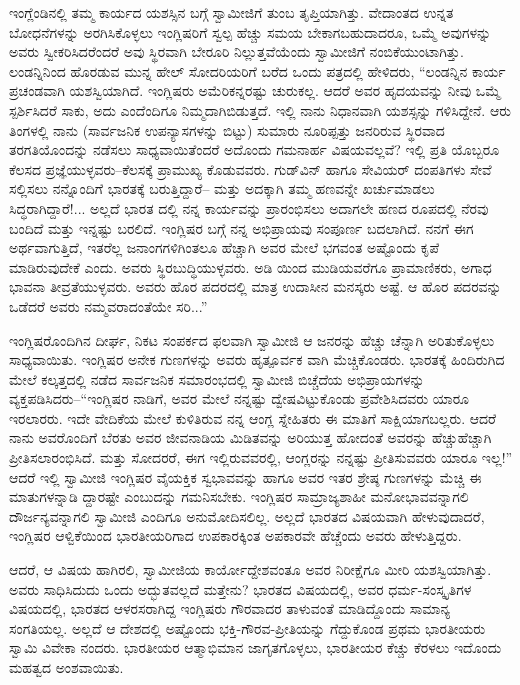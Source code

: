 ಇಂಗ್ಲೆಂಡಿನಲ್ಲಿ ತಮ್ಮ ಕಾರ್ಯದ ಯಶಸ್ಸಿನ ಬಗ್ಗೆ ಸ್ವಾಮೀಜಿಗೆ ತುಂಬ ತೃಪ್ತಿಯಾಗಿತ್ತು. ವೇದಾಂತದ ಉನ್ನತ ಬೋಧನೆಗಳನ್ನು ಅರಗಿಸಿಕೊಳ್ಳಲು ಇಂಗ್ಲಿಷರಿಗೆ ಸ್ವಲ್ಪ ಹೆಚ್ಚು ಸಮಯ ಬೇಕಾಗಬಹುದಾದರೂ, ಒಮ್ಮೆ ಅವುಗಳನ್ನು ಅವರು ಸ್ವೀಕರಿಸಿದರೆಂದರೆ ಅವು ಸ್ಥಿರವಾಗಿ ಬೇರೂರಿ ನಿಲ್ಲುತ್ತವೆಯೆಂದು ಸ್ವಾಮೀಜಿಗೆ ನಂಬಿಕೆಯುಂಟಾಗಿತ್ತು. ಲಂಡನ್ನಿನಿಂದ ಹೊರಡುವ ಮುನ್ನ ಹೇಲ್ ಸೋದರಿಯರಿಗೆ ಬರೆದ ಒಂದು ಪತ್ರದಲ್ಲಿ ಹೇಳಿದರು, “ಲಂಡನ್ನಿನ ಕಾರ್ಯ ಪ್ರಚಂಡವಾಗಿ ಯಶಸ್ವಿಯಾಗಿದೆ. ಇಂಗ್ಲಿಷರು ಅಮೆರಿಕನ್ನರಷ್ಟು ಚುರುಕಲ್ಲ. ಆದರೆ ಅವರ ಹೃದಯವನ್ನು ನೀವು ಒಮ್ಮೆ ಸ್ಪರ್ಶಿಸಿದರೆ ಸಾಕು, ಅದು ಎಂದೆಂದಿಗೂ ನಿಮ್ಮದಾಗಿಬಿಡುತ್ತದೆ. ಇಲ್ಲಿ ನಾನು ನಿಧಾನವಾಗಿ ಯಶಸ್ಸನ್ನು ಗಳಿಸಿದ್ದೇನೆ. ಆರು ತಿಂಗಳಲ್ಲಿ ನಾನು (ಸಾರ್ವಜನಿಕ ಉಪನ್ಯಾಸಗಳನ್ನು ಬಿಟ್ಟು) ಸುಮಾರು ನೂರಿಪ್ಪತ್ತು ಜನರಿರುವ ಸ್ಥಿರವಾದ ತರಗತಿಯೊಂದನ್ನು ನಡೆಸಲು ಸಾಧ್ಯವಾಯಿತೆಂದರೆ ಅದೊಂದು ಗಮನಾರ್ಹ ವಿಷಯವಲ್ಲವೆ? ಇಲ್ಲಿ ಪ್ರತಿ ಯೊಬ್ಬರೂ ಕೆಲಸದ ಪ್ರಜ್ಞೆಯುಳ್ಳವರು–ಕೆಲಸಕ್ಕೆ ಪ್ರಾಮುಖ್ಯ ಕೊಡುವವರು. ಗುಡ್​ವಿನ್ ಹಾಗೂ ಸೇವಿಯರ್ ದಂಪತಿಗಳು ಸೇವೆ ಸಲ್ಲಿಸಲು ನನ್ನೊಂದಿಗೆ ಭಾರತಕ್ಕೆ ಬರುತ್ತಿದ್ದಾರೆ– ಮತ್ತು ಅದಕ್ಕಾಗಿ ತಮ್ಮ ಹಣವನ್ನೇ ಖರ್ಚುಮಾಡಲು ಸಿದ್ಧರಾಗಿದ್ದಾರೆ!... ಅಲ್ಲದೆ ಭಾರತ ದಲ್ಲಿ ನನ್ನ ಕಾರ್ಯವನ್ನು ಪ್ರಾರಂಭಿಸಲು ಅದಾಗಲೇ ಹಣದ ರೂಪದಲ್ಲಿ ನೆರವು ಬಂದಿದೆ ಮತ್ತು ಇನ್ನಷ್ಟು ಬರಲಿದೆ. ಇಂಗ್ಲಿಷರ ಬಗ್ಗೆ ನನ್ನ ಅಭಿಪ್ರಾಯವು ಸಂಪೂರ್ಣ ಬದಲಾಗಿದೆ. ನನಗೆ ಈಗ ಅರ್ಥವಾಗುತ್ತಿದೆ, ಇತರೆಲ್ಲ ಜನಾಂಗಗಳಿಗಿಂತಲೂ ಹೆಚ್ಚಾಗಿ ಅವರ ಮೇಲೆ ಭಗವಂತ ಅಷ್ಟೊಂದು ಕೃಪೆ ಮಾಡಿರುವುದೇಕೆ ಎಂದು. ಅವರು ಸ್ಥಿರಬುದ್ಧಿಯುಳ್ಳವರು. ಅಡಿ ಯಿಂದ ಮುಡಿಯವರೆಗೂ ಪ್ರಾಮಾಣಿಕರು, ಅಗಾಧ ಭಾವನಾ ತೀವ್ರತೆಯುಳ್ಳವರು. ಅವರು ಹೊರ ಪದರದಲ್ಲಿ ಮಾತ್ರ ಉದಾಸೀನ ಮನಸ್ಕರು ಅಷ್ಟೆ. ಆ ಹೊರ ಪದರವನ್ನು ಒಡೆದರೆ ಅವರು ನಮ್ಮವರಾದಂತೆಯೇ ಸರಿ...”

ಇಂಗ್ಲಿಷರೊಂದಿಗಿನ ದೀರ್ಘ, ನಿಕಟ ಸಂಪರ್ಕದ ಫಲವಾಗಿ ಸ್ವಾಮೀಜಿ ಆ ಜನರನ್ನು ಹೆಚ್ಚು ಚೆನ್ನಾಗಿ ಅರಿತುಕೊಳ್ಳಲು ಸಾಧ್ಯವಾಯಿತು. ಇಂಗ್ಲಿಷರ ಅನೇಕ ಗುಣಗಳನ್ನು ಅವರು ಹೃತ್ಪೂರ್ವಕ ವಾಗಿ ಮೆಚ್ಚಿಕೊಂಡರು. ಭಾರತಕ್ಕೆ ಹಿಂದಿರುಗಿದ ಮೇಲೆ ಕಲ್ಕತ್ತದಲ್ಲಿ ನಡೆದ ಸಾರ್ವಜನಿಕ ಸಮಾರಂಭದಲ್ಲಿ ಸ್ವಾಮೀಜಿ ಬಿಚ್ಚೆದೆಯ ಅಭಿಪ್ರಾಯಗಳನ್ನು ವ್ಯಕ್ತಪಡಿಸಿದರು–“ಇಂಗ್ಲಿಷರ ನಾಡಿಗೆ, ಅವರ ಮೇಲೆ ನನ್ನಷ್ಟು ದ್ವೇಷವಿಟ್ಟುಕೊಂಡು ಪ್ರವೇಶಿಸಿದವರು ಯಾರೂ ಇರಲಾರರು. ಇದೇ ವೇದಿಕೆಯ ಮೇಲೆ ಕುಳಿತಿರುವ ನನ್ನ ಆಂಗ್ಲ ಸ್ನೇಹಿತರು ಈ ಮಾತಿಗೆ ಸಾಕ್ಷಿಯಾಗಬಲ್ಲರು. ಆದರೆ ನಾನು ಅವರೊಂದಿಗೆ ಬೆರತು ಅವರ ಜೀವನಾಡಿಯ ಮಿಡಿತವನ್ನು ಅರಿಯುತ್ತ ಹೋದಂತೆ ಅವರನ್ನು ಹೆಚ್ಚುಹೆಚ್ಚಾಗಿ ಪ್ರೀತಿಸಲಾರಂಭಿಸಿದೆ. ಮತ್ತು ಸೋದರರೆ, ಈಗ ಇಲ್ಲಿರುವವರಲ್ಲಿ, ಆಂಗ್ಲರನ್ನು ನನ್ನಷ್ಟು ಪ್ರೀತಿಸುವವರು ಯಾರೂ ಇಲ್ಲ!” ಆದರೆ ಇಲ್ಲಿ ಸ್ವಾಮೀಜಿ ಇಂಗ್ಲಿಷರ ವೈಯಕ್ತಿಕ ಸ್ವಭಾವವನ್ನು ಹಾಗೂ ಅವರ ಇತರ ಶ್ರೇಷ್ಠ ಗುಣಗಳನ್ನು ಮೆಚ್ಚಿ ಈ ಮಾತುಗಳನ್ನಾಡಿ ದ್ದಾರಷ್ಟೇ ಎಂಬುದನ್ನು ಗಮನಿಸಬೇಕು. ಇಂಗ್ಲಿಷರ ಸಾಮ್ರಾಜ್ಯಶಾಹೀ ಮನೋಭಾವವನ್ನಾಗಲಿ ದೌರ್ಜನ್ಯವನ್ನಾಗಲಿ ಸ್ವಾಮೀಜಿ ಎಂದಿಗೂ ಅನುಮೋದಿಸಲಿಲ್ಲ. ಅಲ್ಲದೆ ಭಾರತದ ವಿಷಯವಾಗಿ ಹೇಳುವುದಾದರೆ, ಇಂಗ್ಲಿಷರ ಆಳ್ವಿಕೆಯಿಂದ ಭಾರತೀಯರಿಗಾದ ಉಪಕಾರಕ್ಕಿಂತ ಅಪಕಾರವೇ ಹೆಚ್ಚೆಂದು ಅವರು ಹೇಳುತ್ತಿದ್ದರು.

ಆದರೆ, ಆ ವಿಷಯ ಹಾಗಿರಲಿ, ಸ್ವಾಮೀಜಿಯ ಕಾರ್ಯೋದ್ದೇಶವಂತೂ ಅವರ ನಿರೀಕ್ಷೆಗೂ ಮೀರಿ ಯಶಸ್ವಿಯಾಗಿತ್ತು. ಅವರು ಸಾಧಿಸಿದುದು ಒಂದು ಅದ್ಭುತವಲ್ಲದೆ ಮತ್ತೇನು? ಭಾರತದ ವಿಷಯದಲ್ಲಿ, ಅವರ ಧರ್ಮ-ಸಂಸ್ಕೃತಿಗಳ ವಿಷಯದಲ್ಲಿ, ಭಾರತದ ಆಳರಸರಾಗಿದ್ದ ಇಂಗ್ಲಿಷರು ಗೌರವಾದರ ತಾಳುವಂತೆ ಮಾಡಿದ್ದೊಂದು ಸಾಮಾನ್ಯ ಸಂಗತಿಯಲ್ಲ. ಅಲ್ಲದೆ ಆ ದೇಶದಲ್ಲಿ ಅಷ್ಟೊಂದು ಭಕ್ತಿ-ಗೌರವ-ಪ್ರೀತಿಯನ್ನು ಗೆದ್ದುಕೊಂಡ ಪ್ರಥಮ ಭಾರತೀಯರು ಸ್ವಾಮಿ ವಿವೇಕಾ ನಂದರು. ಭಾರತೀಯರ ಆತ್ಮಾಭಿಮಾನ ಜಾಗೃತಗೊಳ್ಳಲು, ಭಾರತೀಯರ ಕೆಚ್ಚು ಕೆರಳಲು ಇದೊಂದು ಮಹತ್ವದ ಅಂಶವಾಯಿತು.

